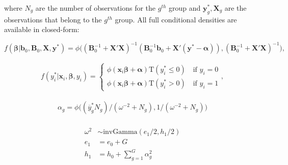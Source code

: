\documentclass[11pt,a4paper]{article}
\newcommand{\f}{\mathit{f}}
\begin{document}
where $N_g$ are the number of observations for the $g^{th}$ group and $\mathbf{y}_g^*, \mathbf{X}_{g}$ are the observations that belong to the $g^{th}$ group. All full conditional densities are available in closed-form: 

\begin{equation}
	\f(\boldsymbol{\beta} | \mathbf{b}_0, \mathbf{B}_0, \mathbf{X}, \mathbf{y}^{*}) = 
		\phi \big (  (\mathbf{B}_0^{-1} + \mathbf{X}'\mathbf{X})^{-1} (\mathbf{B}_0^{-1} \mathbf{b}_0 + \mathbf{X}'(\mathbf{y}^{*}-\bm{\alpha})), (\mathbf{B}_0^{-1} + \mathbf{X}'\mathbf{X})^{-1} \big ),
\end{equation} 

\begin{equation}
\begin{split}
	  \f(y_{i}^{*} | \mathbf{x}_i, \boldsymbol{\beta}, y_i)  = \left \{
	  \begin{array}{ll}
	    	\phi(\mathbf{x}_i \boldsymbol{\beta}+\bm{\alpha})\mathrm{T}(y_i^* \leq 0) \quad \text{if \ } y_i = 0 \\
	    	\phi(\mathbf{x}_i \boldsymbol{\beta}+\bm{\alpha})\mathrm{T}(y_i^* > 0) \quad \text{if \ } y_i = 1
	  \end{array} \right.,
\end{split}	
\end{equation}


\begin{equation}
\begin{split}
	\alpha_g = \phi \big (  (\overline{y}_g^{*} N_g)/(\omega^{-2} + N_g) , 1/(\omega^{-2} + N_g) \big ) \\
\end{split}
\end{equation}

\begin{equation}
\begin{split}
	\omega^2 &\sim \mathrm{invGamma}(e_1/2,h_1/2) \\
	e_1 &= e_0 + G \\
	h_1 &= h_0 + \sum_{g=1}^G \alpha_g^2 \\
\end{split}
\end{equation}




\end{document}
